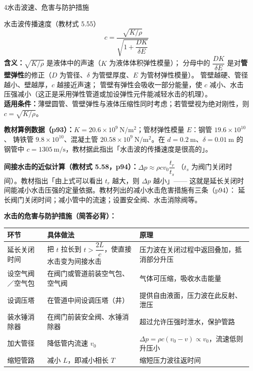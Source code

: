 \begin{kaodian}{4}{水击波速、危害与防护措施}
\begin{gongshi}{水击波传播速度（教材式 5.55）}
\[ c=\frac{\sqrt{K/\rho}}{\sqrt{1+\dfrac{DK}{\delta E}}} \]
\textbf{含义：}$\sqrt{K/\rho}$ 是液体中的声速（$K$ 为液体体积弹性模量）；
分母中的 $\dfrac{DK}{\delta E}$ 是对\textbf{管壁弹性}的修正（$D$ 为管径、$\delta$ 为管壁厚度、$E$ 为管材弹性模量）。
管壁越硬、管径越小、壁越厚，$c$ 越接近声速；
管壁有弹性会吸收一部分能量，使 $c$ 减小、水击压强减小（这正是采用弹性管道或加设弹性元件能减轻水击的机理）。
\\
\textbf{适用条件：}薄壁圆管、管壁弹性与液体压缩性同时考虑；若管壁视为绝对刚性，则 $c=\sqrt{K/\rho}$。
\end{gongshi}

\textbf{教材算例数据（p93）：}$K=20.6\times10^9\ \mathrm{N/m^2}$；管材弹性模量 $E$：钢管 $19.6\times10^{10}$、
铸铁管 $9.8\times10^{10}$、混凝土管 $20.58\times10^9\ \mathrm{N/m^2}$。在 $d=0.2\ \mathrm{m}$、$\delta=0.01\ \mathrm{m}$
的钢管中 $c=1305\ \mathrm{m/s}$，教材据此指出「水击波的传播速度是很高的」。

\textbf{间接水击的近似计算（教材式 5.58，p94）：}$\Delta p\approx\rho c v_0\dfrac{t_r}{t_s}$
（$t_s$ 为阀门关闭时间）。教材指出「由上式可以看出 $t_r$ 越大，则 $\Delta p$ 越小」——
这就是延长关闭时间能减小水击压强的定量依据。教材列出的减小水击危害措施有三条（p94）：
延长阀门关闭时间；减小管中的流速；设置安全阀、水击消除阀等。

\textbf{水击的危害与防护措施（简答必背）：}
\begin{center}
\begin{tabularx}{\textwidth}{@{}lXX@{}}
\toprule
环节 & 具体做法 & 原理 \\
\midrule
延长关闭时间 & 把 $t$ 拉长到 $t>\dfrac{2L}{c}$，使直接水击变为间接水击 & 压力波在关闭过程中返回叠加，抵消部分升压 \\
设空气阀／空气包 & 在阀门或管道前装空气包、空气阀 & 气体可压缩，吸收水击能量 \\
设调压塔 & 在管道中间设调压塔（井） & 提供自由液面，压力波在此反射、泄压 \\
装水锤消除器 & 在阀门前装安全阀、水锤消除器 & 超过允许压强时泄水，保护管路 \\
加大管径 & 降低管内流速 $v_0$ & $\Delta p=\rho c(v_0-v)\propto v_0$，流速低则升压小 \\
缩短管路 & 减小 $L$，即减小相长 $T$ & 缩短压力波往返时间 \\
\bottomrule
\end{tabularx}
\end{center}


\end{kaodian}
